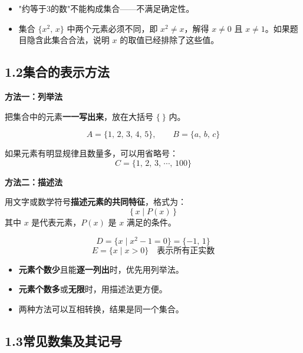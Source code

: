 \documentclass[12pt, a4paper]{ctexart}
\begin{document}
\begin{warnbox}[易错提醒]
\begin{itemize}[leftmargin=2em]
  \item "约等于3的数"不能构成集合——不满足确定性。
  \item 集合 $\{x^2,\, x\}$ 中两个元素必须不同，即 $x^2 \neq x$，解得 $x\neq 0$ 且 $x\neq 1$。如果题目隐含此集合合法，说明 $x$ 的取值已经排除了这些值。
\end{itemize}
\end{warnbox}

\subsection*{1.2\quad 集合的表示方法}

\begin{knowledgebox}[两种常用表示方法]

\textbf{方法一：列举法}

把集合中的元素\textbf{一一写出来}，放在大括号 $\{\ \}$ 内。

\[
A = \{1,\, 2,\, 3,\, 4,\, 5\}, \qquad
B = \{a,\, b,\, c\}
\]

如果元素有明显规律且数量多，可以用省略号：
\[
C = \{1,\, 2,\, 3,\, \cdots,\, 100\}
\]

\vspace{6pt}
\textbf{方法二：描述法}

用文字或数学符号\textbf{描述元素的共同特征}，格式为：
\[
\{\, x \mid P(x) \,\}
\]
其中 $x$ 是代表元素，$P(x)$ 是 $x$ 满足的条件。

\[
D = \{x \mid x^2 - 1 = 0\} = \{-1,\, 1\}
\]
\[
E = \{x \mid x > 0\} \quad\text{表示所有正实数}
\]
\end{knowledgebox}

\begin{tipbox}
\begin{itemize}[leftmargin=2em]
  \item \textbf{元素个数少}且能\textbf{逐一列出}时，优先用列举法。
  \item \textbf{元素个数多}或\textbf{无限}时，用描述法更方便。
  \item 两种方法可以互相转换，结果是同一个集合。
\end{itemize}
\end{tipbox}

\subsection*{1.3\quad 常见数集及其记号}
\end{document}
